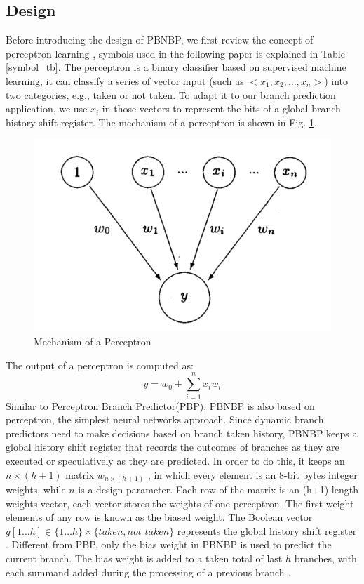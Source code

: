 \documentclass[conference]{IEEEtran}
\begin{document}
\subsection{Design}
Before introducing the design of PBNBP, we first review the concept of perceptron learning \cite{block1962perceptron}, symbols used in the following paper is explained in Table \ref{symbol_tb}. The perceptron is a binary classifier based on supervised machine learning, it can classify a series of vector input (such as $<x_1,x_2,\dots ,x_n>$) into two categories, e.g., taken or not taken. To adapt it to our branch prediction application, we use $x_i$ in those vectors to represent the bits of a global branch history shift register. The mechanism of a perceptron is shown in Fig. \ref{perceptron_fig}. 
\begin{figure}[htbp]
\begin{center}
\includegraphics[width=0.7\linewidth]{perceptron.png} 
\end{center}	   
\caption{Mechanism of a Perceptron}\label{perceptron_fig}
\end{figure}

\noindent The output of a perceptron is computed as:
\begin{equation}
	y=w_0+\sum _{i=1}^{n}x_i w_i
\end{equation}
Similar to Perceptron Branch Predictor(PBP), PBNBP is also based on perceptron, the simplest neural networks approach. Since dynamic branch predictors need to make decisions based on branch taken history, PBNBP keeps a global history shift register that records the outcomes of branches as they are executed or speculatively as they are predicted. In order to do this, it keeps an $ n\times (h+1)$ matrix $w_{n\times (h+1)}$ , in which every element is an 8-bit bytes integer weights, while $n$ is a design parameter. Each row of the matrix is an (h+1)-length weights vector, each vector stores the weights of one perceptron. The first weight elements of any row is known as the biased weight. The Boolean vector $g[1\dots h]\in \{1\dots h\}\times \{taken, not\_taken\}$ represents the global history shift register \cite{jimenez2001dynamic}. Different from PBP, only the bias weight in PBNBP is used to predict the current branch. The bias weight is added to a taken total of last $h$ branches, with each summand added during the processing of a previous branch \cite{jimenez2003fast}. 
\end{document}
